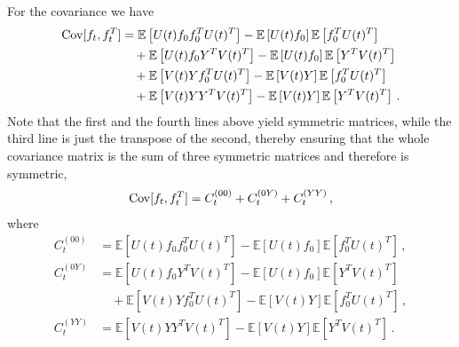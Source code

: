 For the covariance we have 
\begin{align}
    \mathrm{Cov}[f_t,f_t^T]
        &= \mathbb{E}\left[U(t) f_0 f_0^T U(t)^T\right] 
            - \mathbb{E}\left[U(t) f_0\right] \mathbb{E}\left[f_0^T U(t)^T\right]  \nonumber \\
        &\quad + \mathbb{E}\left[U(t) f_0 Y^T V(t)^T\right] 
            - \mathbb{E}\left[U(t) f_0\right] \mathbb{E}\left[Y^T V(t)^T\right] \nonumber \\
        &\quad + \mathbb{E}\left[V(t) Y f_0^T U(t)^T\right]
            - \mathbb{E}\left[V(t) Y\right] \mathbb{E}\left[f_0^T U(t)^T\right] \nonumber \\
    \label{eq:CovAtT}
        &\quad + \mathbb{E}\left[V(t) Y Y^T V(t)^T\right]
            - \mathbb{E}\left[V(t) Y\right] \mathbb{E}\left[Y^T V(t)^T\right] \, .
\end{align}
Note that the first and the fourth lines above yield symmetric matrices, while
the third line is just the transpose of the second, thereby ensuring that the
whole covariance matrix is the sum of three symmetric matrices and therefore is
symmetric, 
\begin{align}
    \label{eq:SumOfCovariances}
    \mathrm{Cov}[f_t,f_t^T] = C_t^{(00)} + C_t^{(0Y)} + C_t^{(YY)}\, ,
\end{align}
where
\begin{align}
    \label{eq:C00term}
    C_t^{(00)} 
        &= \mathbb{E}\left[U(t) f_0 f_0^T U(t)^T\right] 
        - \mathbb{E}\left[U(t) f_0\right] \mathbb{E}\left[f_0^T U(t)^T\right]\, ,\\
    C_t^{(0Y)}
        &= \mathbb{E}\left[U(t) f_0 Y^T V(t)^T\right] 
        - \mathbb{E}\left[U(t) f_0\right] \mathbb{E}\left[Y^T V(t)^T\right] \nonumber \\
        \label{eq:C0Yterm}
        &\quad + \mathbb{E}\left[V(t) Y f_0^T U(t)^T\right]
            - \mathbb{E}\left[V(t) Y\right] \mathbb{E}\left[f_0^T U(t)^T\right] \, ,\\
    C_t^{(YY)}
        &= \mathbb{E}\left[V(t) Y Y^T V(t)^T\right]
        - \mathbb{E}\left[V(t) Y\right] \mathbb{E}\left[Y^T V(t)^T\right]\, .
\end{align}

